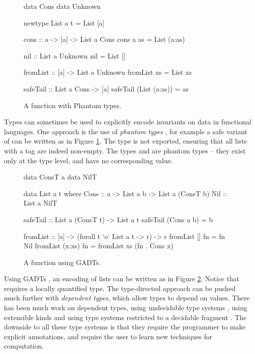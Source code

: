 \begin{figure}
\begin{code}
data Cons
data Unknown

newtype List a t = List [a]

cons :: a -> [a] -> List a Cons
cons a as = List (a:as)

nil :: List a Unknown
nil = List []

fromList :: [a] -> List a Unknown
fromList xs = List xs

safeTail :: List a Cons -> [a]
safeTail (List (a:as)) = as
\end{code}
\caption{A  function with Phantom types.}
\label{fig:phantom}
\figureend
\end{figure}

Types can sometimes be used to explicitly encode invariants on data in functional languages. One approach is the use of \textit{phantom types} \citep{fluet:phantom}, for example a safe variant of  can be written as in Figure \ref{fig:phantom}. The  type is not exported, ensuring that all lists with a  tag are indeed non-empty. The types  and  are phantom types -- they exist only at the type level, and have no corresponding value.

\begin{figure}
\ignore\begin{code}
data ConsT a
data NilT

data List a t where
    Cons  :: a -> List a b -> List a (ConsT b)
    Nil   :: List a NilT

safeTail :: List a (ConsT t) -> List a t
safeTail (Cons a b) = b

fromList :: [a] -> (forall t `o` List a t -> r) -> r
fromList []      fn = fn Nil
fromList (x:xs)  fn = fromList xs (fn . Cons x)
\end{code}
\caption{A  function using GADTs.}
\label{fig:gadt}
\figureend
\end{figure}

Using GADTs \citep{spj:gadt}, an encoding of lists can be written as in Figure \ref{fig:gadt}. Notice that  requires a locally quantified type. The type-directed approach can be pushed much further with \textit{dependent types}, which allow types to depend on values. There has been much work on dependent types, using undecidable type systems \citep{epigram}, using extensible kinds \citep{omega} and using type systems restricted to a decidable fragment \citep{xi:dependent_practical}. The downside to all these type systems is that they require the programmer to make explicit annotations, and require the user to learn new techniques for computation.


